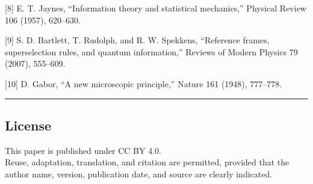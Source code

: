 \documentclass[
]{article}
\begin{document}
{[}8{]} E. T. Jaynes, ``Information theory and statistical mechanics,''
Physical Review 106 (1957), 620--630.

{[}9{]} S. D. Bartlett, T. Rudolph, and R. W. Spekkens, ``Reference
frames, superselection rules, and quantum information,'' Reviews of
Modern Physics 79 (2007), 555--609.

{[}10{]} D. Gabor, ``A new microscopic principle,'' Nature 161 (1948),
777--778.

\begin{center}\rule{0.5\linewidth}{0.5pt}\end{center}

\subsection{License}\label{license}

This paper is published under CC BY 4.0.\\
Reuse, adaptation, translation, and citation are permitted, provided
that the author name, version, publication date, and source are clearly
indicated.
\end{document}
